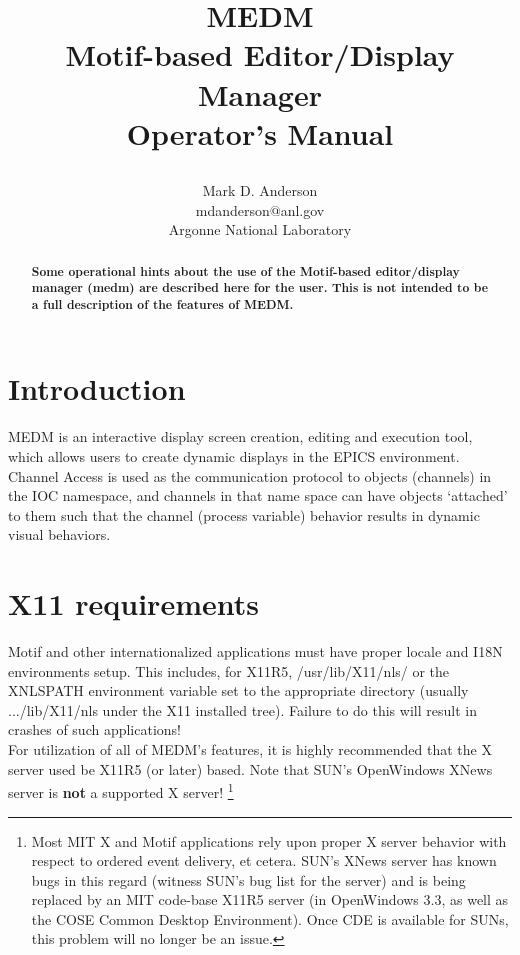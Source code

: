 %
\title{
{\huge MEDM\\{\Large Motif-based Editor/Display Manager}\\
\vspace{12pt}Operator's Manual}
\vspace{24pt}
\author{Mark D. Anderson\\
mdanderson$@$anl.gov\\
Argonne National Laboratory}
}


\maketitle

\begin{abstract}
\bf
\noindent Some operational hints about the use of the Motif-based
editor/display manager (medm) are described here for the user.  This is not
intended to be a full description of the features of MEDM.
\end{abstract}

\section{Introduction}

MEDM is an interactive display screen creation, editing and execution tool,
which allows users to create dynamic displays in the EPICS environment.
Channel Access is used as the communication protocol to objects (channels) in
the IOC namespace, and channels in that name space can have objects
`attached' to them such that the channel (process variable) behavior results
in dynamic visual behaviors.\\


\section{X11 requirements}

Motif and other internationalized applications must have proper locale
and I18N environments setup.  This includes, for X11R5, /usr/lib/X11/nls/
or the XNLSPATH environment variable set to the appropriate directory
(usually .../lib/X11/nls under the X11 installed tree).  Failure to do
this will result in crashes of such applications!\\

\noindent For utilization of all of MEDM's features, it is highly recommended
that the X server used be X11R5 (or later) based.  Note that SUN's OpenWindows
XNews server is {\bf not} a supported X server! \footnote{Most MIT X and
Motif applications rely upon proper X server behavior
with respect to ordered event delivery, et cetera. SUN's XNews server has known
bugs in this regard (witness SUN's bug list for the server) and is being
replaced by an MIT code-base X11R5 server (in OpenWindows 3.3, as well
as the COSE Common Desktop Environment).  Once CDE is available for SUNs, this
problem will no longer be an issue.}


